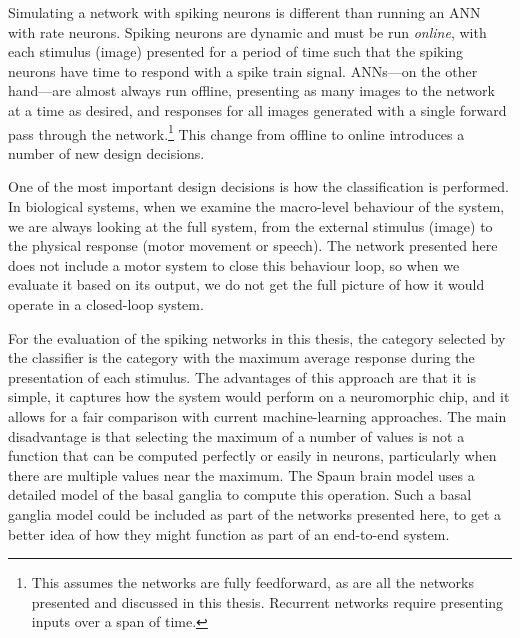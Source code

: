 Simulating a network with spiking neurons
is different than running an ANN with rate neurons.
Spiking neurons are dynamic and must be run \emph{online},
with each stimulus (image) presented for a period of time
such that the spiking neurons have time to respond with a spike train signal.
ANNs---on the other hand---are almost always run offline,
presenting as many images to the network at a time as desired,
and responses for all images generated with a single forward pass
through the network.\footnote{
  This assumes the networks are fully feedforward,
  as are all the networks presented and discussed in this thesis.
  Recurrent networks require presenting inputs over a span of time.}
This change from offline to online introduces a number of new design decisions.

One of the most important design decisions
is how the classification is performed.
In biological systems, when we examine the macro-level behaviour of the system,
we are always looking at the full system,
from the external stimulus (image) to the physical response
(motor movement or speech).
The network presented here does not include a motor system
to close this behaviour loop,
so when we evaluate it based on its output,
we do not get the full picture of how it would operate
in a closed-loop system.

For the evaluation of the spiking networks in this thesis,
the category selected by the classifier
is the category with the maximum average response
during the presentation of each stimulus.
The advantages of this approach are that it is simple,
it captures how the system would perform on a neuromorphic chip,
and it allows for a fair comparison with current machine-learning approaches.
The main disadvantage is that selecting the maximum of a number of values
is not a function that can be computed perfectly or easily in neurons,
particularly when there are multiple values near the maximum.
The Spaun brain model \parencite{Eliasmith2012}
uses a detailed model of the basal ganglia to compute this operation.
Such a basal ganglia model could be included
as part of the networks presented here,
to get a better idea of how they might function as part of an end-to-end system.

